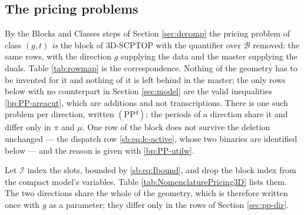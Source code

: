 

\subsection{The pricing problems}
\label{sec:pp}

By the Blocks and Classes steps of Section \ref{sec:decomp} the pricing
problem of class $(g,t)$ \emph{is} the block of 3D-SCPTOP with the
quantifier over $\mathcal{B}$ removed: the same rows, with the direction
$g$ supplying the data and the master supplying the duals. Table
\ref{tab:rowmap} is the correspondence. Nothing of the geometry has to
be invented for it and nothing of it is left behind in the master; the
only rows below with no counterpart in Section \ref{sec:model} are the
valid inequalities \eqref{bp:PP-areacut}, which are additions and not
transcriptions. There is
one such problem per direction, written $(\mathrm{PP}^{g})$; the periods
of a direction share it and differ only in $\pi$ and $\mu$. One row of
the block does not survive the deletion unchanged --- the dispatch row
\eqref{sb:eq:lc-active}, whose two binaries are identified below --- and
the reason is given with \eqref{bp:PP-utilw}.

Let $\mathcal{I}$ index the slots, bounded by \eqref{sb:eq:Ibound}, and
drop the block index from the compact model's variables. Table
\ref{tab:NomenclaturePricing3D} lists them. The two directions share
the whole of the geometry, which is therefore written once with $g$ as
a parameter; they differ only in the rows of Section
\ref{sec:pp-dir}.

